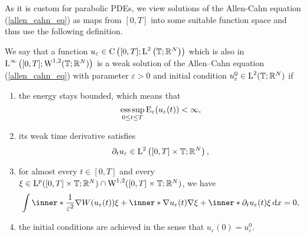 As it is custom for parabolic PDEs, we view solutions of the Allen-Cahn equation (\ref{allen_cahn_eq}) as maps from $ [0,T] $ into some suitable function space and thus use the following definition.

\begin{definition}
	\label{solution_to_ac}
	We say that a function 
	$ u_{ \varepsilon} \in 
	\mathrm{ C } \left( [0 , T ] ; \operatorname{L}^{ 2 } \left( \operatorname{\mathbb{T}}; \mathbb{ R }^{ N } \right) \right) $
	which is also in
	$\operatorname{L}^{ \infty } \left( [0, T ]; \operatorname{W}^{ 1, 2 } ( \operatorname{\mathbb{T}} ; \mathbb{ R }^{ N } ) \right)
	$
	is a weak solution of the Allen--Cahn equation (\ref{allen_cahn_eq}) with parameter $ \varepsilon > 0 $ and initial condition $ u_{ \varepsilon}^{ 0 } \in \operatorname{L}^{ 2 } ( \operatorname{\mathbb{T}} ; \mathbb{ R }^{ N } ) $ if
	\begin{enumerate}
		\item the energy stays bounded, which means that
		\begin{equation}
			\operatorname*{ess\,sup}_{ 0 \leq t \leq T }
			\operatorname{E}_{ \varepsilon } ( u_{ \varepsilon } ( t ) ) 
			< \infty,
		\end{equation}
		\item 
		its weak time derivative satisfies
		\begin{equation}
			\partial_{ t } u_{ \varepsilon }
			\in
			\operatorname{L}^{ 2 } \left( [ 0 , T ] \times \operatorname{\mathbb{T}} ; \mathbb{ R }^{ N } \right),
		\end{equation}
		\item 
		for almost every $ t \in [ 0 , T ] $ and every 
		$ \xi \in \operatorname{L}^{ p } ( [ 0 , T ] \times \operatorname{\mathbb{T}}; \mathbb{ R }^{ N } ) 
		\cap
		\operatorname{W}^{ 1, 2 } ( [ 0, T ] \times \operatorname{\mathbb{T}} ; \mathbb{ R }^{ N } ) $,
		we have
		\begin{equation}
			\label{ac_weak_equation}
			\int
			\inner*{ \frac{ 1 }{ \varepsilon^{ 2 } } \nabla W ( u_{ \varepsilon} ( t ) ) }{ \xi }
			+
			\inner*{ \nabla u_{ \varepsilon } ( t ) }{ \nabla \xi } 
			+
			\inner*{\partial_{ t } u_{ \varepsilon} ( t ) }{ \xi }
			\dd{x}
			=
			0,
		\end{equation}
		\item 
		the initial conditions are achieved in the sense that $ u_{ \varepsilon } ( 0 ) = u_{ \varepsilon}^{ 0 } $.
	\end{enumerate}
\end{definition}

